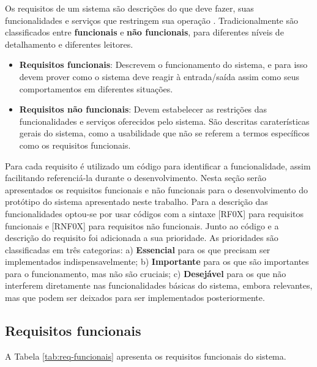 Os requisitos de um sistema são descrições do que deve fazer, suas funcionalidades e serviços que restringem sua operação \citep{Sommerville2010}. Tradicionalmente são classificados entre \textbf{funcionais} e \textbf{não funcionais}, para diferentes níveis de detalhamento e diferentes leitores.

\begin{itemize}
	\item{\textbf{Requisitos funcionais}: Descrevem o funcionamento do sistema, e para isso devem prover como o sistema deve reagir à entrada/saída assim como seus comportamentos em diferentes situações.}
	
	\item{\textbf{Requisitos não funcionais}: Devem estabelecer as restrições das funcionalidades e serviços oferecidos pelo sistema. São descritas caraterísticas gerais do sistema, como a usabilidade que não se referem a termos específicos como os requisitos funcionais.}
\end{itemize}

Para cada requisito é utilizado um código para identificar a funcionalidade, assim facilitando referenciá-la durante o desenvolvimento. Nesta seção serão apresentados os requisitos funcionais e não funcionais para o desenvolvimento do protótipo do sistema apresentado neste trabalho. Para a descrição das funcionalidades optou-se por usar códigos com a sintaxe [RF0X] para requisitos funcionais e [RNF0X] para requisitos não funcionais. Junto ao código e a descrição do requisito foi adicionada a sua prioridade. As prioridades são classificadas em três categorias: a) \textbf{Essencial} para os que precisam ser implementados indispensavelmente; b) \textbf{Importante} para os que são importantes para o funcionamento, mas não são cruciais; c) \textbf{Desejável} para os que não interferem diretamente nas funcionalidades básicas do sistema, embora relevantes, mas que podem ser deixados para ser implementados posteriormente.

\subsection{Requisitos funcionais}

A Tabela \ref{tab:req-funcionais} apresenta os requisitos funcionais do sistema.

